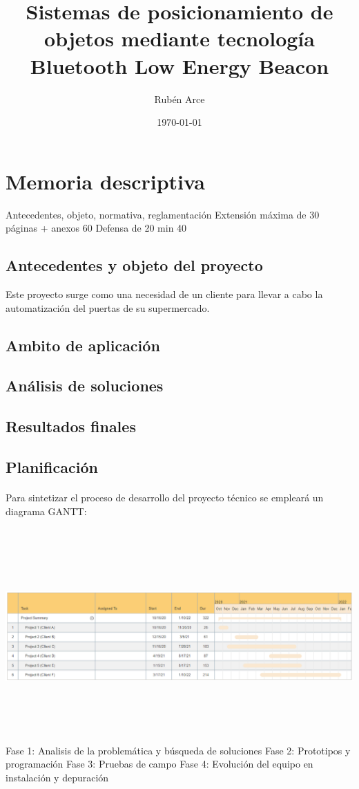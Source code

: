 \documentclass[a4paper ,12pt, onecolumn]{article}
\begin{document}
\title{Sistemas de posicionamiento de objetos mediante tecnología Bluetooth Low Energy
Beacon }
\author{Rubén Arce}
\date{\today}
\maketitle
\cleardoublepage
\tableofcontents
\cleardoublepage
\section{Memoria descriptiva}
Antecedentes, objeto, normativa, reglamentación
Extensión máxima de 30 páginas + anexos 60
Defensa de 20 min  40
    \subsection{Antecedentes y objeto del proyecto}
    Este proyecto surge como una necesidad de un cliente para llevar a cabo la automatización del puertas
    de su supermercado. 
    \subsection{Ambito de aplicación}
    \subsection{Análisis de soluciones}
    \subsection{Resultados finales}
    \subsection{Planificación}
        \paragraph{}
        Para sintetizar el proceso de desarrollo del proyecto técnico se empleará un diagrama GANTT: 
        \paragraph{}
        \includegraphics[width=15cm, height=8cm]{gantt.PNG}
        Fase 1: Analisis de la problemática y búsqueda de soluciones
        Fase 2: Prototipos y programación
        Fase 3: Pruebas de campo
        Fase 4: Evolución del equipo en instalación y depuración 
\end{document}
